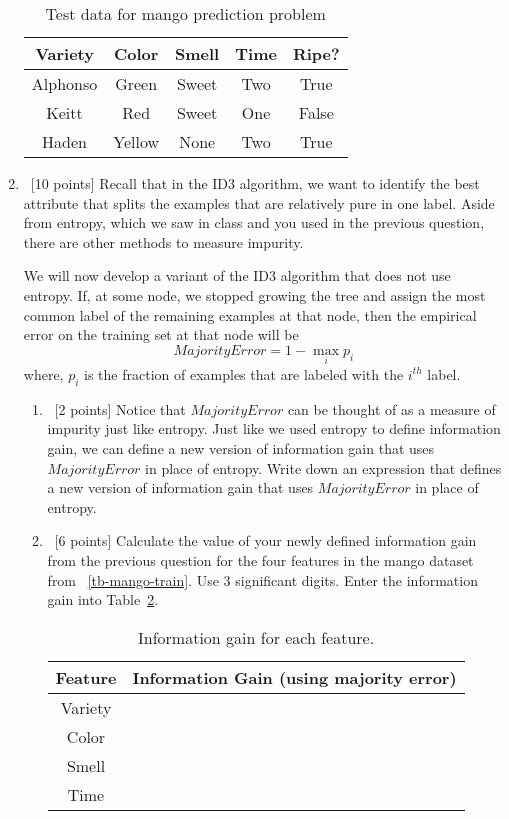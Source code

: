 \begin{enumerate}
  \begin{table}[h!]
    \centering
    \begin{tabular}{cccc|c}
      \hline
      Variety & Color  & Smell  & Time & Ripe?  \\ \hline
      Alphonso& Green  & Sweet  & Two  & True   \\
      Keitt   & Red    & Sweet  & One  & False  \\
      Haden   & Yellow & None   & Two  & True   \\ \hline
    \end{tabular}
    \caption{Test data for mango prediction problem}\label{tb-mango-test}
  \end{table}

\item~[10 points] Recall that in the ID3 algorithm, we want to identify the best attribute that splits the examples that are relatively pure in one label.
  Aside from entropy, which we saw in class and you used in the previous question, there are other methods to measure impurity.

  We will now develop a variant of the ID3 algorithm that does not use entropy. If, at some node, we stopped growing the tree and assign the most common label of the remaining examples at that node, then the empirical error on the training set at that node will be
  $$MajorityError = 1 - \max_{i}p_i$$
  where, $p_i$ is the fraction of examples that are labeled with the $i^{th}$ label.





  \begin{enumerate}
  \item~[2 points]   Notice that $MajorityError$ can be thought of as a measure of impurity just like entropy. Just like we used entropy to define information gain, we can define a new version of information gain that uses $MajorityError$ in place of entropy. Write down an expression that defines a new version of information gain that uses $MajorityError$ in place of entropy.

  \item~[6 points] Calculate the value of your newly defined information gain from the previous question for the four features in the mango dataset from ~\ref{tb-mango-train}. Use 3 significant digits. Enter the information gain into Table~\ref{tb-maj-ig}.

    \begin{table}[h!]
      \centering
      \begin{tabular}{c|c}
        \hline
        Feature & Information Gain (using majority error) \\ \hline
        Variety &                  \\
        Color   &                  \\
        Smell   &                  \\
        Time    &                  \\ \hline
      \end{tabular}
      \caption{Information gain for each feature.}\label{tb-maj-ig}
    \end{table}


\end{enumerate}
\end{enumerate}
